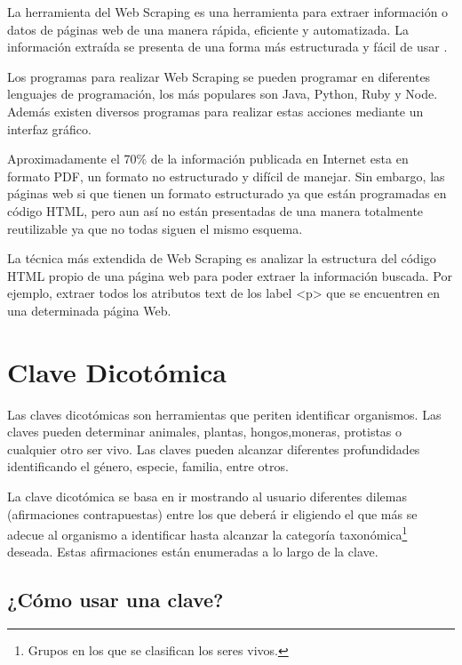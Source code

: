 La herramienta del Web Scraping es una herramienta para extraer información o datos de páginas web de una manera rápida, eficiente y automatizada. La información extraída se presenta de una forma más estructurada y fácil de usar \cite{webScraping}.

Los programas para realizar Web Scraping se pueden programar en diferentes lenguajes de programación, los más populares son Java, Python, Ruby y Node. Además existen diversos programas para realizar estas acciones mediante un interfaz gráfico.

Aproximadamente el 70\% de la información publicada en Internet esta en formato PDF, un formato no estructurado y difícil de manejar. Sin embargo, las páginas web si que tienen un formato estructurado ya que están programadas en código HTML, pero aun así no están presentadas de una manera totalmente reutilizable ya que no todas siguen el mismo esquema.

La técnica más extendida de Web Scraping es analizar la estructura del código HTML propio de una página web para poder extraer la información buscada. Por ejemplo, extraer todos los atributos text de los label <p> que se encuentren en una determinada página Web.


\section{Clave Dicotómica}

Las claves dicotómicas son herramientas que periten identificar organismos. Las claves pueden determinar animales, plantas, hongos,moneras, protistas o cualquier otro ser vivo. Las claves pueden alcanzar diferentes profundidades identificando el género, especie, familia, entre otros.

La clave dicotómica se basa en ir mostrando al usuario diferentes dilemas (afirmaciones contrapuestas) entre los que deberá ir eligiendo el que más se adecue al organismo a identificar hasta alcanzar la categoría taxonómica\footnote{Grupos en los que se clasifican los seres vivos.} deseada. Estas afirmaciones están enumeradas a lo largo de la clave.

\subsection{¿Cómo usar una clave?}

